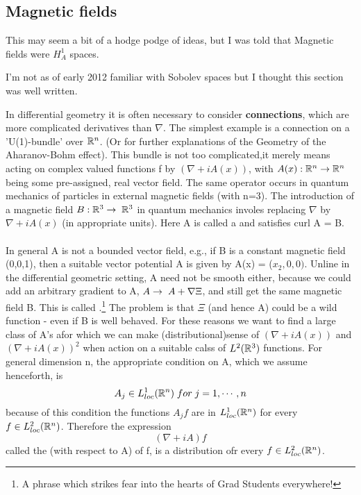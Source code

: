 \subsection{Magnetic fields}
This may seem a bit of a hodge podge of ideas, but I was told that Magnetic fields were $H^1_A$ spaces.
\begin{rem}
I'm not as of early 2012 familiar with Sobolev spaces but I thought this section was well written.  
\end{rem}
 In differential geometry it is often necessary to consider \textbf{connections}, which are more complicated derivatives
than $\nabla$. The simplest example is a connection on a 'U(1)-bundle' over $\mathbb{R}^n$\cite{differentialmanifolds}. 
(Or for further
explanations of the Geometry of the Aharanov-Bohm effect\cite{geometricphase2004}). This bundle is not too complicated,it 
merely means acting on complex valued functions f by $(\nabla + iA(x))$, with $A(x):\mathbb{R}^n \rightarrow \mathbb{R}^n$
being some pre-assigned, real vector field. The same operator occurs in quantum mechanics of particles in external magnetic fields 
(with n=3). The introduction of a magnetic field $B: \mathbb{R}^3 \rightarrow \; \mathbb{R}^3$ in quantum mechanics involes replacing 
$\nabla$ by $\nabla + iA(x)$ (in appropriate units). Here A is called a  and satisfies 
curl A = B.
\paragraph{}
In general A is not a bounded vector field, e.g., if B is a constant magnetic field (0,0,1), then a suitable vector potential A is given
by A(x) = ($x_2,0,0)$. Unline in the differential geometric setting, A need not be smooth either, because we could add
an arbitrary gradient to A, $A \rightarrow \; A + \nabla \Xi$, and still get the same magnetic field B. This is called 
.\footnote{A phrase which strikes fear into the hearts of Grad Students everywhere!}
   The problem is that $\Xi$ (and hence A) could be a wild function - even if B is well behaved.
\newline For these reasons we want to find a large class of A's afor which we can make (distributional)sense of $(\nabla + iA(x))$
and $(\nabla + iA(x))^2$ when action on a suitable calss of $L^2(\mathbb{R}^3)$ functions.
    For general dimension n, the appropriate condition on A, which we assume henceforth, is 
\begin{equation}
 A_j\in L^1_{loc}(\mathbb{R}^n) \;for\;j=1,\cdots,n
\end{equation}
because of this condition the functions $A_j f$ are in $L^1_{loc}(\mathbb{R}^n)$ for every $f\in L^2_{loc}(\mathbb{R}^n)$. Therefore the expression
\begin{equation*}
 (\nabla + iA)f
\end{equation*}
called the (with respect to A) of f, is a distribution ofr every $f\in L^2_{loc}(\mathbb{R}^n)$.
